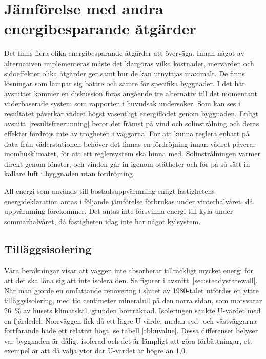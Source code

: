 \section{Jämförelse med andra energibesparande åtgärder}

Det finns flera olika energibesparande åtgärder att överväga. Innan något av alternativen implementeras måste det klargöras vilka kostnader, mervärden och sidoeffekter olika åtgärder ger samt hur de kan utnyttjas maximalt. De finns lösningar som lämpar sig bättre och sämre för specifika byggnader. I det här avsnittet kommer en diskussion föras angående tre alternativ till det momentant väderbaserade system som rapporten i huvudsak undersöker. 
Som kan ses i resultatet påverkar vädret högst väsentligt energiflödet genom byggnaden. Enligt avsnitt~\ref{resultsfreerunning} beror det främst på vind och solinstrålning och deras effekter fördröjs inte av trögheten i väggarna. För att kunna reglera enbart på data från väderstationen behöver det finnas en fördröjning innan vädret påverar inomhusklimatet, för att ett reglersystem ska hinna med. Solinstrålningen värmer direkt genom fönster, och vinden går in igenom otätheter och för på så sätt in kallare luft i byggnaden utan fördröjning.

All energi som används till bostadsuppvärmning enligt fastighetens energideklaration\cite{energideklaration} antas i följande jämförelse förbrukas under vinterhalvåret, då uppvärmning förekommer. Det antas inte försvinna energi till kyla under sommarhalvåret, då fastigheten idag inte har något kylsystem.

\subsection{Tilläggsisolering}
Våra beräkningar visar att väggen inte absorberar tillräckligt mycket energi för att det ska löna sig att inte isolera den. Se figurer i avsnitt~\ref{sec:steadystatewall}.
När man gjorde en omfattande renovering i slutet av 1980-talet utfördes en yttre tilläggsisolering, med tio centimeter mineralull på den norra sidan\cite{arsredovisning}, som motsvarar 26~\% av husets klimatskal, grunden borträknad. Isoleringen sänkte U-värdet med en fjärdedel. Norrväggen fick då ett lägre U-värde, medan syd- och västväggarna fortfarande hade ett relativt högt, se tabell \ref{tbl:uvalue}.
Dessa differenser belyser var byggnaden är dåligt isolerad och det är lämpligt att göra förbättningar, ett exempel är att då välja ytor där U-värdet är högre än 1,0.

